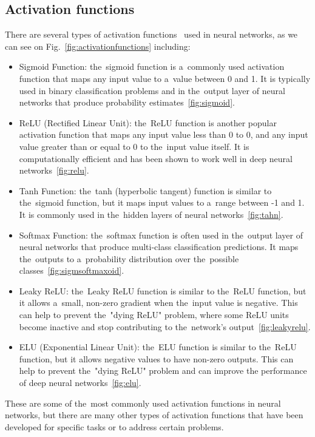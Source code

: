 \subsection{Activation functions} \label{subsec:nnaf}
There are several types of activation functions~\cite{geron2022hands} used in neural networks, as we can see on Fig.~\ref{fig:activationfunctions} including:
\begin{itemize}
    \item Sigmoid Function: the~sigmoid function is a~commonly used activation function that maps any input value
    to a~value between 0 and 1. It is typically used in binary classification problems and in the~output layer of
    neural networks that produce probability estimates~\ref{fig:sigmoid}.
    \item ReLU (Rectified Linear Unit): the~ReLU function is another popular activation function that maps any
    input value less than 0 to 0, and any input value greater than or equal to 0 to the~input value itself.
    It is computationally efficient and has been shown to work well in deep neural networks~\ref{fig:relu}.
    \item Tanh Function: the~tanh (hyperbolic tangent) function is similar to the~sigmoid function,
    but it maps input values to a~range between -1 and 1. It is commonly used in the~hidden layers of neural networks~\ref{fig:tahn}.
    \item Softmax Function: the~softmax function is often used in the~output layer of neural networks that produce
    multi-class classification predictions. It maps the~outputs to a~probability distribution over the~possible classes~\ref{fig:sigmsoftmaxoid}.
    \item Leaky ReLU: the~Leaky ReLU function is similar to the~ReLU function, but it allows a~small, non-zero
    gradient when the~input value is negative. This can help to prevent the~"dying ReLU" problem, where some ReLU
    units become inactive and stop contributing to the~network's output~\ref{fig:leakyrelu}.
    \item ELU (Exponential Linear Unit): the~ELU function is similar to the~ReLU function, but it allows negative
    values to have non-zero outputs. This can help to prevent the~"dying ReLU" problem and can improve the
    performance of deep neural networks~\ref{fig:elu}.
\end{itemize}
These are some of the~most commonly used activation functions in neural networks, but there are many other types of
activation functions that have been developed for specific tasks or to address certain problems.

